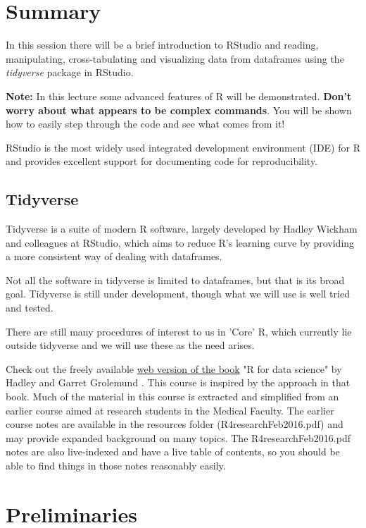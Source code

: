 \documentclass[titlepage]{book}\usepackage{knitr}
\begin{document}
\section{Summary}
In this session there will be a brief introduction to RStudio and reading, manipulating, cross-tabulating and visualizing data from dataframes using the \emph{tidyverse} package in RStudio.

\textbf{Note:} In this lecture some advanced features of R will be demonstrated. \textbf{Don't worry about what appears to be complex commands}. You will be shown how to easily step through the code and see what comes from it! 

RStudio is the most widely used integrated development environment (IDE) for R and provides excellent support for documenting code for reproducibility.

\subsection{Tidyverse}
Tidyverse is a suite of modern R software, largely developed by Hadley Wickham and colleagues at RStudio, which aims to reduce R's learning curve by providing a more consistent way of dealing with dataframes. 

Not all the software in tidyverse is limited to dataframes, but that is its broad goal.   Tidyverse is still under development, though what we will use is well tried and tested. 

There are still many procedures of interest to us in 'Core' R, which currently lie outside tidyverse and we will use these as the need arises. 

Check out the freely available \href{https://r4ds.had.co.nz/index.html}{web version of the book} "R for data science" by Hadley and Garret Grolemund \cite{Wickham2017}. This course is inspired by the approach in that book.  Much of the material in this course is extracted and simplified from an earlier course aimed at research students in the Medical Faculty. The earlier course notes are available in the resources folder (R4researchFeb2016.pdf) and may provide expanded background on many topics. The R4researchFeb2016.pdf notes are also live-indexed and have a live table of contents, so you should be able to find things in those notes reasonably easily.

\section{Preliminaries}
\end{document}
